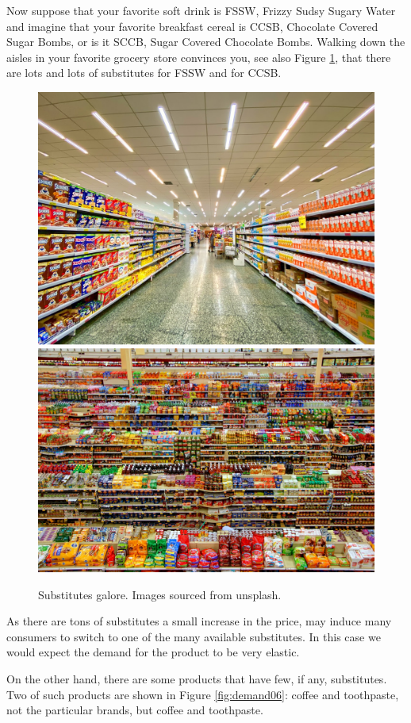 \documentclass[
]{book}
\begin{document}
Now suppose that your favorite soft drink is FSSW, Frizzy Sudsy Sugary Water and imagine that your favorite breakfast cereal is CCSB, Chocolate Covered Sugar Bombs, or is it SCCB, Sugar Covered Chocolate Bombs. Walking down the aisles in your favorite grocery store convinces you, see also Figure \ref{fig:demand05}, that there are lots and lots of substitutes for FSSW and for CCSB.

\begin{figure}

{\centering \includegraphics[width=0.45\linewidth]{img/demand/fig5} \includegraphics[width=0.45\linewidth]{img/demand/fig5b} 

}

\caption{Substitutes galore. Images sourced from unsplash.}\label{fig:demand05}
\end{figure}

As there are tons of substitutes a small increase in the price, may induce many consumers to switch to one of the many available substitutes. In this case we would expect the demand for the product to be very elastic.

On the other hand, there are some products that have few, if any, substitutes. Two of such products are shown in Figure \ref{fig:demand06}: coffee and toothpaste, not the particular brands, but coffee and toothpaste.
\end{document}
